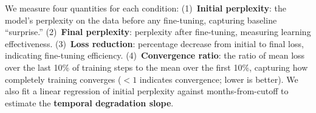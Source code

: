 \begin{table}[t]
    \centering
    \caption{Dataset conditions for fine-tuning convergence analysis. Each condition contains approximately 50K tokens. Months from cutoff is measured relative to \mistral's September 2023 knowledge boundary.}
    \label{tab:conditions}
\end{table}

 We measure four quantities for each condition: (1)~\textbf{Initial perplexity}: the model's perplexity on the data before any fine-tuning, capturing baseline ``surprise.'' (2)~\textbf{Final perplexity}: perplexity after fine-tuning, measuring learning effectiveness. (3)~\textbf{Loss reduction}: percentage decrease from initial to final loss, indicating fine-tuning efficiency. (4)~\textbf{Convergence ratio}: the ratio of mean loss over the last 10\% of training steps to the mean over the first 10\%, capturing how completely training converges ($<1$ indicates convergence; lower is better). We also fit a linear regression of initial perplexity against months-from-cutoff to estimate the \textbf{temporal degradation slope}.

